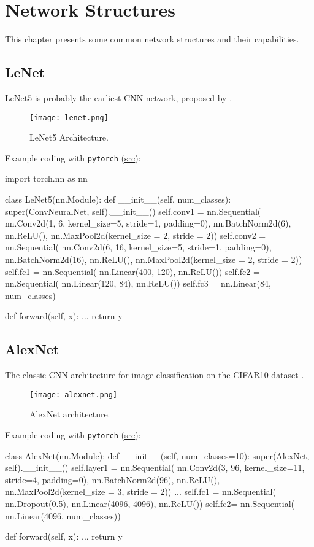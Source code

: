 \chapter{Network Structures}
This chapter presents some common network structures and their capabilities.

\section{LeNet}
LeNet5 is probably the earliest \ac{CNN} network, proposed by .

\begin{figure}[hbt!]
	\centering
	\texttt{[image: lenet.png]}
	\caption{LeNet5 Architecture. \cite{lecun1998gradient}}
\end{figure}

Example coding with \texttt{pytorch} (\href{https://blog.paperspace.com/writing-lenet5-from-scratch-in-python/}{src}):
\begin{python}
import torch.nn as nn
	
class LeNet5(nn.Module):
	def __init__(self, num_classes):
		super(ConvNeuralNet, self).__init__()
		self.conv1 = nn.Sequential(
		nn.Conv2d(1, 6, kernel_size=5, stride=1, padding=0),
		nn.BatchNorm2d(6),
		nn.ReLU(),
		nn.MaxPool2d(kernel_size = 2, stride = 2))
		self.conv2 = nn.Sequential(
		nn.Conv2d(6, 16, kernel_size=5, stride=1, padding=0),
		nn.BatchNorm2d(16),
		nn.ReLU(),
		nn.MaxPool2d(kernel_size = 2, stride = 2))
		self.fc1 = nn.Sequential(
		nn.Linear(400, 120),
		nn.ReLU())
		self.fc2 = nn.Sequential(
		nn.Linear(120, 84),
		nn.ReLU())
		self.fc3 = nn.Linear(84, num_classes)
	
	def forward(self, x):
		...
		return y
\end{python}

\section{AlexNet}
The classic \ac{CNN} architecture for image classification on the CIFAR10 dataset \cite{krizhevsky2012imagenet}.

\begin{figure}[hbt!]
	\centering
	\texttt{[image: alexnet.png]}
	\caption{AlexNet architecture. \cite{krizhevsky2012imagenet}}
\end{figure}

Example coding with \texttt{pytorch} (\href{https://blog.paperspace.com/alexnet-pytorch/}{src}):
\begin{python}	
class AlexNet(nn.Module):
	def __init__(self, num_classes=10):
		super(AlexNet, self).__init__()
		self.layer1 = nn.Sequential(
		nn.Conv2d(3, 96, kernel_size=11, stride=4, padding=0),
		nn.BatchNorm2d(96),
		nn.ReLU(),
		nn.MaxPool2d(kernel_size = 3, stride = 2))
		...
		self.fc1 = nn.Sequential(
		nn.Dropout(0.5),
		nn.Linear(4096, 4096),
		nn.ReLU())
		self.fc2= nn.Sequential(
		nn.Linear(4096, num_classes))
	
	def forward(self, x):
		...
		return y
\end{python}

